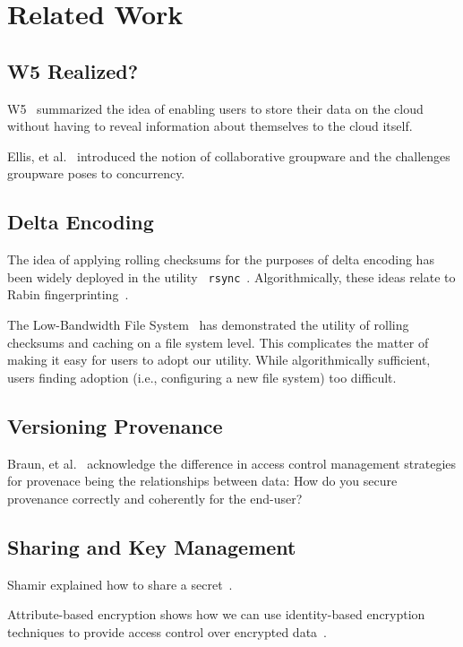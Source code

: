 \section{Related Work}

\subsection{W5 Realized?}
W5~\cite{w5} summarized the idea of enabling users to store their data
on the cloud without having to reveal information about themselves to
the cloud itself.

Ellis, et al.~\cite{groupware} introduced the notion of collaborative
groupware and the challenges groupware poses to concurrency.

\subsection{Delta Encoding}
The idea of applying rolling checksums for the purposes of delta
encoding has been widely deployed in the utility {\tt
  rsync}~\cite{rsync}. Algorithmically, these ideas relate to Rabin
fingerprinting~\cite{rabinfp}.

The Low-Bandwidth File System~\cite{lbfs} has demonstrated the utility
of rolling checksums and caching on a file system level. This
complicates the matter of making it easy for users to adopt our
utility. While algorithmically sufficient, users finding adoption
(i.e., configuring a new file system) too difficult.

\subsection{Versioning Provenance}

Braun, et al.~\cite{securingprovenance} acknowledge the difference in
access control management strategies for provenace being the
relationships between data: How do you secure provenance correctly and
coherently for the end-user?

\subsection{Sharing and Key Management}
Shamir explained how to share a secret~\cite{shamir}.

Attribute-based encryption shows how we can use identity-based
encryption techniques to provide access control over encrypted
data~\cite{abe}. 

